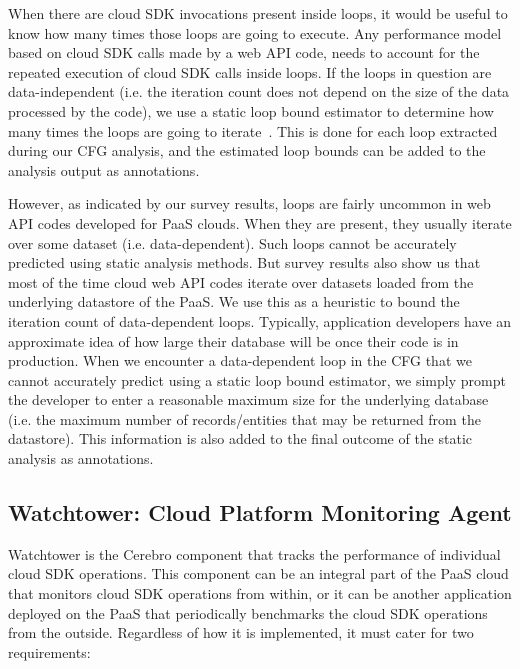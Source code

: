 When there are cloud SDK invocations present inside loops, it would be useful to know how many times those loops
are going to execute. Any performance model based on cloud SDK calls made by a web API code,
needs to account for the repeated execution of cloud SDK calls inside loops. If the 
loops in question are data-independent (i.e. the iteration count does not depend on the size of the data processed 
by the code), we use a static loop bound estimator to determine how many times the loops are going to iterate~\cite{bygde2010static,Gulwani:2009:CRP:1542476.1542518,Lokuciejewski:2009:FPS:1545006.1545064,Hunt:2006:PCL:1167999.1168026}.
This is done for each loop extracted during our CFG analysis, and the estimated loop bounds can be added to the
analysis output as annotations.

However, as indicated by our survey results, loops are fairly uncommon in web API codes developed for PaaS clouds. When
they are present, they usually iterate over some dataset (i.e. data-dependent). Such loops cannot
be accurately predicted using static analysis methods. But survey results also show us that
most of the time cloud web API codes iterate over datasets loaded from the underlying datastore of the PaaS.
We use this as a heuristic to bound the iteration count of data-dependent loops. Typically, application developers
have an approximate idea of how large their database will be once their code is in production. When we encounter a data-dependent
loop in the CFG that we cannot accurately predict using a static loop bound estimator, we simply
prompt the developer to enter a reasonable maximum size for the underlying database (i.e. the maximum number of
records/entities that may be returned from the datastore). 
This information is also added to the final outcome of the static analysis as annotations.

\subsection{Watchtower: Cloud Platform Monitoring Agent}
Watchtower is the Cerebro component that tracks the performance of individual
cloud SDK operations. This component can be an integral part of the PaaS cloud that
monitors cloud SDK operations from within, or it can be another application deployed on the PaaS
that periodically benchmarks the cloud SDK operations from the outside. Regardless of how it is
implemented, it must cater for two requirements:

